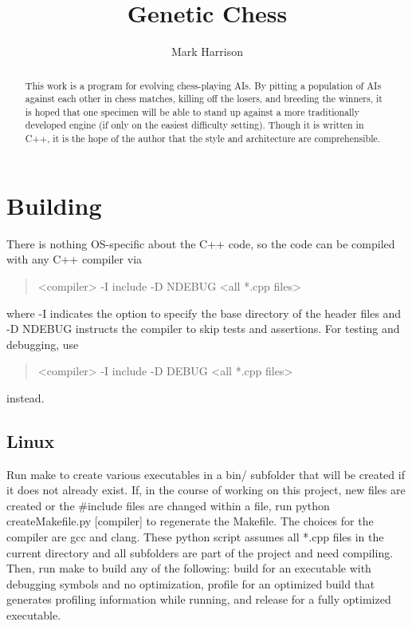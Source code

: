 \documentclass[letterpaper]{article}
\title{Genetic Chess}
\author{Mark Harrison}
\newcommand{\cpp}{C{\nobreak+}{\nobreak+}}
\newcommand{\code}[1]{\small\textsf{#1}}
\renewcommand{\_}{\allowbreak\textunderscore\allowbreak}
\begin{document}
\maketitle

\begin{abstract}
This work is a program for evolving chess-playing AIs.  By pitting a population of AIs against each other in chess matches, killing off the losers, and breeding the winners, it is hoped that one specimen will be able to stand up against a more traditionally developed engine (if only on the easiest difficulty setting). Though it is written in \cpp{}, it is the hope of the author that the style and architecture are comprehensible.
\end{abstract}

\tableofcontents{}


\section{Building}
There is nothing OS-specific about the \cpp{} code, so the code can be compiled with any \cpp{} compiler via
\begin{quote}
	\code{<compiler> -I include -D NDEBUG <all *.cpp files>}
\end{quote}
where \code{-I} indicates the option to specify the base directory of the header files and \code{-D NDEBUG} instructs the compiler to skip tests and assertions. For testing and debugging, use
\begin{quote}
	\code{<compiler> -I include -D DEBUG <all *.cpp files>}
\end{quote}
instead.

\subsection{Linux}
Run \code{make} to create various executables in a \code{bin/} subfolder that will be created if it does not already exist. If, in the course of working on this project, new files are created or the \code{\#include} files are changed within a file, run \code{python create\_Makefile.py [compiler]} to regenerate the Makefile. The choices for the compiler are \code{gcc} and \code{clang}. These python script assumes all \code{*.cpp} files in the current directory and all subfolders are part of the project and need compiling. Then, run \code{make} to build any of the following: \code{build} for an executable with debugging symbols and no optimization, \code{profile} for an optimized build that generates profiling information while running, and \code{release} for a fully optimized executable.
\end{document}

